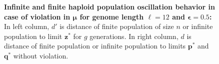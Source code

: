 \begin{figure}[h]
\begin{center}
\hspace{-3em}%
\vspace{-0.5em} \hspace{-3em}%


\caption{\textbf{Infinite and finite haploid population oscillation behavior in case of violation in $\bm{\mu}$ for genome length $\ell = 12$ and $\bm{\epsilon} = 0.5$:} 
  In left column, $d'$ is distance of finite population of size $n$ or infinite population to limit $\bm{z}^\ast$ for $g$ generations. In right column, $d$ is distance of finite population or infinite population to limits $\bm{p}^\ast$ and $\bm{q}^\ast$ without violation.}
\label{oscillation_12h_vio_mu_0.5}
\end{center}
\end{figure}

